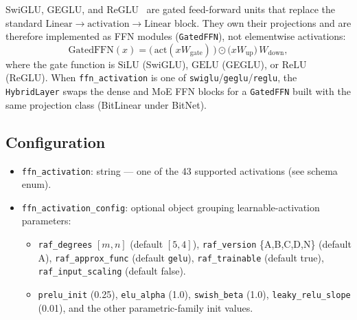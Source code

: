 SwiGLU, GEGLU, and ReGLU~\citep{shazeer2020glu} are gated feed-forward units
that replace the standard $\text{Linear}\to\text{activation}\to\text{Linear}$
block. They own their projections and are therefore implemented as FFN modules
(\texttt{GatedFFN}), not elementwise activations:
\[
\text{GatedFFN}(x) = \big(\,\text{act}(xW_{\text{gate}})\,\big) \odot \big(xW_{\text{up}}\big)\, W_{\text{down}},
\]
where the gate function is $\text{SiLU}$ (SwiGLU), $\text{GELU}$ (GEGLU), or
$\text{ReLU}$ (ReGLU). When \texttt{ffn\_activation} is one of
\texttt{swiglu}/\texttt{geglu}/\texttt{reglu}, the \texttt{HybridLayer} swaps
the dense and MoE FFN blocks for a \texttt{GatedFFN} built with the same
projection class (BitLinear under BitNet).

\subsection{Configuration}

\begin{itemize}[leftmargin=*]
    \item \texttt{ffn\_activation}: string --- one of the 43 supported activations (see schema enum).
    \item \texttt{ffn\_activation\_config}: optional object grouping learnable-activation parameters:
    \begin{itemize}
        \item \texttt{raf\_degrees} $[m,n]$ (default $[5,4]$), \texttt{raf\_version} \{A,B,C,D,N\} (default A),
        \texttt{raf\_approx\_func} (default \texttt{gelu}), \texttt{raf\_trainable} (default true),
        \texttt{raf\_input\_scaling} (default false).
        \item \texttt{prelu\_init} (0.25), \texttt{elu\_alpha} (1.0), \texttt{swish\_beta} (1.0),
        \texttt{leaky\_relu\_slope} (0.01), and the other parametric-family init values.
    \end{itemize}
\end{itemize}
